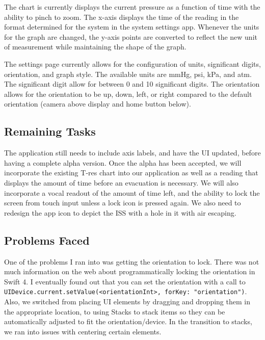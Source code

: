 \documentclass[onecolumn, draftclsnofoot,10pt, compsoc]{IEEEtran}
\begin{document}
        The chart is currently displays the current pressure as a function of time with the ability to pinch to zoom.
        The x-axis displays the time of the reading in the format determined for the system in the system settings app.
        Whenever the units for the graph are changed, the y-axis points are converted to reflect the new unit of measurement while maintaining the shape of the graph.

        The settings page currently allows for the configuration of units, significant digits, orientation, and graph style.
        The available units are mmHg, psi, kPa, and atm.
        The significant digit allow for between 0 and 10 significant digits.
        The orientation allows for the orientation to be up, down, left, or right compared to the default orientation (camera above display and home button below).

    \subsection{Remaining Tasks}
        The application still needs to include axis labels, and have the UI updated, before having a complete alpha version.
        Once the alpha has been accepted, we will incorporate the existing T-res chart into our application as well as a reading that displays the amount of time before an evacuation is necessary.
        We will also incorporate a vocal readout of the amount of time left, and the ability to lock the screen from touch input unless a lock icon is pressed again.
        We also need to redesign the app icon to depict the ISS with a hole in it with air escaping.

    \subsection{Problems Faced}
        One of the problems I ran into was getting the orientation to lock.
        There was not much information on the web about programmatically locking the orientation in Swift 4.
        I eventually found out that you can set the orientation with a call to \texttt{UIDevice.current.setValue(<orientationInt>, forKey: "orientation")}.
        Also, we switched from placing UI elements by dragging and dropping them in the appropriate location, to using Stacks to stack items so they can be automatically adjusted to fit the orientation/device.
        In the transition to stacks, we ran into issues with centering certain elements.
\end{document}
